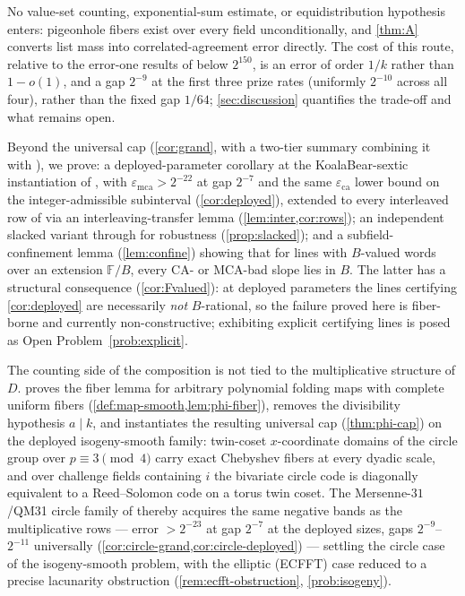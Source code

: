 \documentclass[11pt]{article}
\theoremstyle{definition}
\theoremstyle{remark}
\newcommand{\F}{\mathbb{F}}
\newcommand{\B}{B}
\newcommand{\eca}{\varepsilon_{\mathrm{ca}}}
\newcommand{\emca}{\varepsilon_{\mathrm{mca}}}
\begin{document}
No value-set counting, exponential-sum estimate, or equidistribution hypothesis enters: pigeonhole fibers exist over every field unconditionally, and \cref{thm:A} converts list mass into correlated-agreement error directly. The cost of this route, relative to the error-one results of \cite{Cho26a,Cho26b} below $2^{150}$, is an error of order $1/k$ rather than $1-o(1)$, and a gap $2^{-9}$ at the first three prize rates (uniformly $2^{-10}$ across all four), rather than the fixed gap $1/64$; \cref{sec:discussion} quantifies the trade-off and what remains open.

Beyond the universal cap (\cref{cor:grand}, with a two-tier summary combining it with \cite{Cho26b}), we prove: a deployed-parameter corollary at the KoalaBear-sextic instantiation of \cite[\S6.3]{ABF26}, with $\emca>2^{-22}$ at gap $2^{-7}$ and the same $\eca$ lower bound on the integer-admissible subinterval (\cref{cor:deployed}), extended to every interleaved row of \cite[Tables~2--3]{ABF26} via an interleaving-transfer lemma (\cref{lem:inter,cor:rows}); an independent slacked variant through \cite[Thm.~1.9]{BCHKS25} for robustness (\cref{prop:slacked}); and a subfield-confinement lemma (\cref{lem:confine}) showing that for lines with $\B$-valued words over an extension $\F/\B$, every CA- or MCA-bad slope lies in $\B$. The latter has a structural consequence (\cref{cor:Fvalued}): at deployed parameters the lines certifying \cref{cor:deployed} are necessarily \emph{not} $\B$-rational, so the failure proved here is fiber-borne and currently non-constructive; exhibiting explicit certifying lines is posed as Open Problem~\ref{prob:explicit}.

The counting side of the composition is not tied to the multiplicative structure of $D$.  proves the fiber lemma for arbitrary polynomial folding maps with complete uniform fibers (\cref{def:map-smooth,lem:phi-fiber}), removes the divisibility hypothesis $a\mid k$, and instantiates the resulting universal cap (\cref{thm:phi-cap}) on the deployed isogeny-smooth family: twin-coset $x$-coordinate domains of the circle group over $p\equiv3\pmod4$ carry exact Chebyshev fibers at every dyadic scale, and over challenge fields containing $i$ the bivariate circle code is diagonally equivalent to a Reed--Solomon code on a torus twin coset. The Mersenne-$31$/QM31 circle family of \cite{HLP24} thereby acquires the same negative bands as the multiplicative rows --- error $>2^{-23}$ at gap $2^{-7}$ at the deployed sizes, gaps $2^{-9}$--$2^{-11}$ universally (\cref{cor:circle-grand,cor:circle-deployed}) --- settling the circle case of the isogeny-smooth problem, with the elliptic (ECFFT) case reduced to a precise lacunarity obstruction (\cref{rem:ecfft-obstruction}, \cref{prob:isogeny}).
\end{document}
